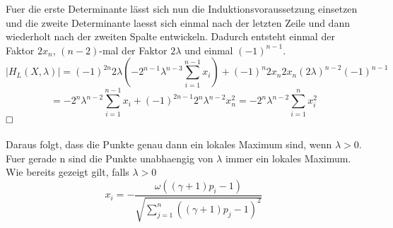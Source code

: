 \documentclass[11pt]{scrartcl}
\begin{document}
			Fuer die erste Determinante lässt sich nun die Induktionsvoraussetzung einsetzen und die zweite Determinante laesst sich einmal nach der letzten Zeile und dann wiederholt nach der zweiten Spalte entwickeln. Dadurch entsteht einmal der Faktor \(2x_{n}\), \((n-2)\)-mal der Faktor \(2\lambda\) und einmal \((-1)^{n-1}\).
			\begin{equation}
			|H_{L}(X,\lambda)|=(-1)^{2n}2\lambda(-2^{n-1}\lambda^{n-3}\sum_{i=1}^{n-1}x_{i})+(-1)^{n}2x_{n}2x_{n}(2\lambda)^{n-2}(-1)^{n-1}
			\end{equation}
			\begin{equation}
			=-2^{n}\lambda^{n-2}\sum_{i=1}^{n-1}x_{i}+(-1)^{2n-1}2^{n}\lambda^{n-2}x_{n}^{2}
			=-2^n\lambda^{n-2}\sum_{i=1}^{n}x_{i}^2
			\end{equation}
			$\hfill\square$\\\\
			Daraus folgt, dass die Punkte genau dann ein lokales Maximum sind, wenn \(\lambda>0\). Fuer gerade n sind die Punkte unabhaengig von \(\lambda\) immer ein lokales Maximum. Wie bereits gezeigt gilt, falls \(\lambda>0\)
			\begin{equation}
			x_{i}=-\frac{\omega((\gamma +1)p_{i}-1)}{\sqrt{\sum_{j=1}^{n}((\gamma +1)p_{j}-1)^2}}
			\end{equation}
\end{document}
